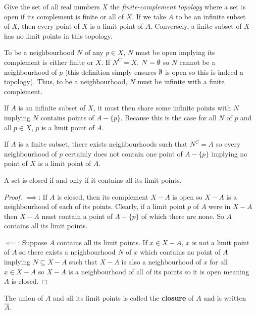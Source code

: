 \begin{example}
    Give the set of all real numbers $X$ the \emph{finite-complement topology} where a set is open if its complement is finite or all of $X$. If we take $A$ to be an infinite subset of $X$, then every point of $X$ is a limit point of $A$. Conversely, a finite subset of $X$ has no limit points in this topology.
\end{example}
\begin{explanation}
    To be a neighbourhood $N$ of any $p \in X$, $N$ must be open implying its complement is either finite or $X$. If $N^C = X$, $N = \emptyset$ so $N$ cannot be a neighbourhood of $p$ (this definition simply ensures $\emptyset$ is open so this is indeed a topology). Thus, to be a neighbourhood, $N$ must be infinite with a finite complement. 
    
    If $A$ is an infinite subset of $X$, it must then share some infinite points with $N$ implying $N$ contains points of $A - \{p\}$. Because this is the case for all $N$ of $p$ and all $p \in X$, $p$ is a limit point of $A$.
    
    If $A$ is a finite subset, there exists neighbourhoods such that $N^C = A$ so every neighbourhood of $p$ certainly does not contain one point of $A - \{p\}$ implying no point of $X$ is a limit point of $A$.
\end{explanation}
\begin{theorem}
    A set is closed if and only if it contains all its limit points.
\end{theorem}
\begin{proof}
    $\implies$: If $A$ is closed, then its complement $X - A$ is open so $X-A$ is a neighbourhood of each of its points. Clearly, if a limit point $p$ of $A$ were in $X-A$ then $X-A$ must contain a point of $A - \{p\}$ of which there are none. So $A$ contains all its limit points.

    $\impliedby$: Suppose $A$ contains all its limit points. If $x \in X-A$, $x$ is not a limit point of $A$ so there exists a neighbourhood $N$ of $x$ which contains no point of $A$ implying $N \subseteq X-A$ such that $X-A$ is also a neighbourhood of $x$ for all $x \in X-A$ so $X-A$ is a neighbourhood of all of its points so it is open meaning $A$ is closed.
\end{proof}
\begin{definition}[Closure]
    The union of $A$ and all its limit points is called the \textbf{closure} of $A$ and is written $\overline{A}$.
\end{definition}
